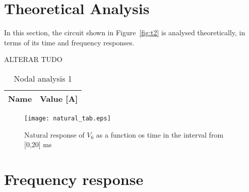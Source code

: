 \section{Theoretical Analysis}
\label{sec:analysis}

In this section, the circuit shown in Figure~\ref{fig:t2} is analysed
theoretically, in terms of its time and frequency responses.

ALTERAR TUDO

  
\begin{table}[h]
  \centering
  \begin{tabular}{|l|r|}
    \hline    
    {\bf Name} & {\bf Value [A]} \\ \hline
    
  \end{tabular}
  \caption{Nodal analysis 1}
  \label{tab:nodal1}
\end{table}


\begin{figure}[h] \centering
  \texttt{[image: natural\_tab.eps]}
  \caption{Natural response of $V_6$ as a function os time in the interval from [0,20] ms}
  \label{fig:natural}
\end{figure} 



\section{Frequency response}



